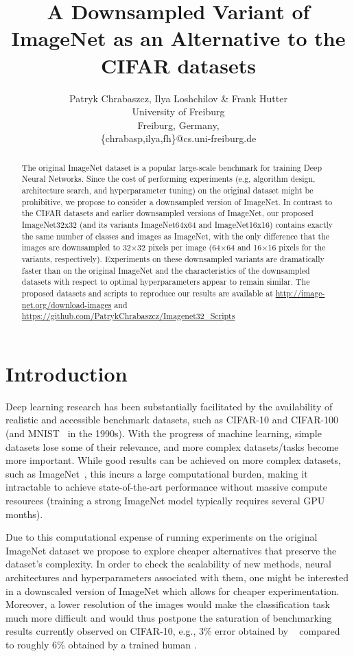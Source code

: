 \documentclass{article} \usepackage{iclr2017_conference,times}
\title{A Downsampled Variant
of ImageNet as an Alternative to the CIFAR datasets}
\author{Patryk Chrabaszcz, Ilya Loshchilov \& Frank Hutter \\
University of Freiburg\\
Freiburg, Germany,\\
\{chrabasp,ilya,fh\}@cs.uni-freiburg.de\\
}
\begin{document}
\maketitle

\begin{abstract}
The  original ImageNet dataset is a popular large-scale benchmark for training Deep Neural Networks. Since the cost of performing experiments (e.g, algorithm design, architecture search, and hyperparameter tuning) on the original dataset might be prohibitive, we propose to consider a downsampled version of ImageNet. In contrast to the CIFAR datasets and earlier downsampled versions of ImageNet, our proposed ImageNet32x32 (and its variants ImageNet64x64 and ImageNet16x16) contains exactly the same number of classes and images as ImageNet, with the only difference that the images are downsampled to 32$\times$32 pixels per image (64$\times$64 and 16$\times$16 pixels for the variants, respectively). Experiments on these downsampled variants are dramatically faster than on the original ImageNet and the characteristics of the downsampled datasets with respect to optimal hyperparameters appear to remain similar. The proposed datasets and scripts to reproduce our results are available at \linebreak \url{http://image-net.org/download-images} and $\;\;\;\;$ \linebreak   \url{https://github.com/PatrykChrabaszcz/Imagenet32_Scripts}
\end{abstract}

\section{Introduction}

Deep learning research has been substantially facilitated by the availability of realistic and accessible benchmark datasets, such as CIFAR-10 and CIFAR-100 \citep{krizhevsky2009learning} (and MNIST~\citep{lecun1998gradient} in the 1990s). With the progress of machine learning, simple datasets lose some of their relevance, and more complex datasets/tasks become more important. While good results can be achieved on more complex datasets, such as ImageNet~\citep{krizhevsky2012imagenet,ILSVRC15}, this incurs a large computational burden, making it intractable to achieve state-of-the-art performance without massive compute resources
(training a strong ImageNet model typically requires several GPU months). 

Due to this computational expense of running experiments on the original ImageNet dataset we propose to explore cheaper alternatives that preserve the dataset's complexity. 
In order to check the scalability of new methods, neural architectures and hyperparameters associated with them, one might be interested in a downscaled version of ImageNet which allows for cheaper experimentation. Moreover, a lower resolution of the images would make the classification task much more difficult and would thus postpone the saturation of benchmarking results currently observed on CIFAR-10, e.g., 3\% error obtained by ~\cite{shakeshake2017} compared to roughly 6\% obtained by a trained human \citep{KarpathyCIFAR10}. 
\end{document}
